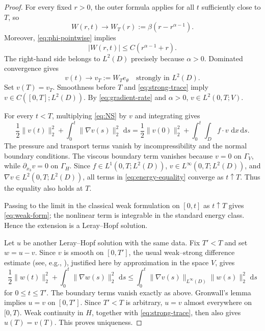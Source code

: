 \documentclass[10pt]{amsart}
\theoremstyle{definition}
\newcommand{\dd}{\,\mathrm d}
\newcommand{\Gv}{\Gamma_{\!V}}
\newcommand{\Gh}{\Gamma_{\!H}}
\begin{document}
\begin{proof}
For every fixed $r>0$, the outer formula applies for all $t$ sufficiently close to
$T$, so
\begin{equation}
\label{eq:terminal-profile}
    W(r,t)\longrightarrow W_T(r):=\beta(r-r^{\alpha-1}).
\end{equation}
Moreover, \eqref{eq:phi-pointwise} implies
\[
    |W(r,t)|\leq C(r^{\alpha-1}+r).
\]
The right-hand side belongs to $L^2(D)$ precisely because $\alpha>0$.
Dominated convergence gives
\begin{equation}
\label{eq:strong-trace}
    v(t)\longrightarrow v_T:=W_Te_\theta
    \quad\text{strongly in }L^2(D).
\end{equation}
Set $v(T)=v_T$.  Smoothness before $T$ and \eqref{eq:strong-trace} imply
$v\in C([0,T];L^2(D))$.  By \eqref{eq:gradient-rate} and $\alpha>0$,
$v\in L^2(0,T;V)$.

For every $t<T$, multiplying \eqref{eq:NS} by $v$ and integrating gives
\begin{equation}
\label{eq:energy-equality}
    \frac12\|v(t)\|_2^2
    +\int_0^t\|\nabla v(s)\|_2^2\,\dd s
    =\frac12\|v(0)\|_2^2
     +\int_0^t\!\int_Df\cdot v\,\dd x\dd s.
\end{equation}
The pressure and transport terms vanish by incompressibility and the normal
boundary conditions.  The viscous boundary term vanishes because $v=0$ on
$\Gv$, while $\partial_{x_3}v=0$ on $\Gh$.  Since
$f\in L^1(0,T;L^2(D))$, $v\in L^\infty(0,T;L^2(D))$, and
$\nabla v\in L^2(0,T;L^2(D))$, all terms in \eqref{eq:energy-equality} converge
as $t\uparrow T$.  Thus the equality also holds at $T$.

Passing to the limit in the classical weak formulation on $[0,t]$ as
$t\uparrow T$ gives \eqref{eq:weak-form}; the nonlinear term is integrable in
the standard energy class.  Hence the extension is a Leray--Hopf solution.

Let $u$ be another Leray--Hopf solution with the same data.  Fix $T'<T$ and set
$w=u-v$.  Since $v$ is smooth on $[0,T']$, the usual weak--strong difference
estimate (see, e.g., \cite{Serrin1963,KozonoSohr1996,FarwigSohrVarnhorn2012}),
justified here by approximation in the space $V$, gives
\begin{equation}
\label{eq:weak-strong}
    \frac12\|w(t)\|_2^2
    +\int_0^t\|\nabla w(s)\|_2^2\,\dd s
    \leq
    \int_0^t\|\nabla v(s)\|_{L^\infty(D)}\|w(s)\|_2^2\,\dd s
\end{equation}
for $0\leq t\leq T'$.  The boundary terms vanish exactly as above.  Gronwall's
lemma implies $u=v$ on $[0,T']$.  Since $T'<T$ is arbitrary, $u=v$ almost
everywhere on $[0,T)$.  Weak continuity in $H$, together with
\eqref{eq:strong-trace}, then also gives $u(T)=v(T)$.  This proves uniqueness.
\end{proof}
\end{document}
